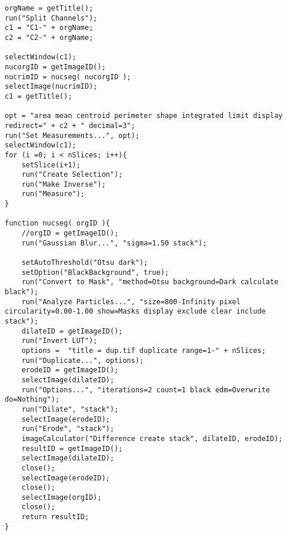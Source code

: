 \begin{lstlisting}
orgName = getTitle();
run("Split Channels");
c1 = "C1-" + orgName;
c2 = "C2-" + orgName;

selectWindow(c1);
nucorgID = getImageID();
nucrimID = nucseg( nucorgID );
selectImage(nucrimID);
c1 = getTitle();

opt = "area mean centroid perimeter shape integrated limit display redirect=" + c2 + " decimal=3";
run("Set Measurements...", opt);
selectWindow(c1);
for (i =0; i < nSlices; i++){
	setSlice(i+1);
	run("Create Selection");
	run("Make Inverse");
	run("Measure");
}

function nucseg( orgID ){
	//orgID = getImageID();
	run("Gaussian Blur...", "sigma=1.50 stack");
	
	setAutoThreshold("Otsu dark");
	setOption("BlackBackground", true);
	run("Convert to Mask", "method=Otsu background=Dark calculate black");
	run("Analyze Particles...", "size=800-Infinity pixel circularity=0.00-1.00 show=Masks display exclude clear include stack");
	dilateID = getImageID();
	run("Invert LUT");
	options =  "title = dup.tif duplicate range=1-" + nSlices;
	run("Duplicate...", options);
	erodeID = getImageID();
	selectImage(dilateID);
	run("Options...", "iterations=2 count=1 black edm=Overwrite do=Nothing");
	run("Dilate", "stack");
	selectImage(erodeID);
	run("Erode", "stack");
	imageCalculator("Difference create stack", dilateID, erodeID);
	resultID = getImageID();
	selectImage(dilateID);
	close();
	selectImage(erodeID);
	close();
	selectImage(orgID);
	close();
	return resultID;
}
\end{lstlisting}
